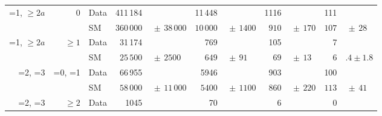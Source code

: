 \begin{table}[!t]
\begin{tabular}{rrlr@{}lr@{}lr@{}lr@{}l}
    =1, ${\geq}2a$ & 0         & Data & 411\,184   &                   & 11\,448   &                & 1116  &               & 111                  \\
                   &           & SM   & $360\,000$ & $\,\pm\, 38\,000$ & $10\,000$ & $\,\pm\, 1400$ & $910$ & $\,\pm\, 170$ & $107$ & $\,\pm\, 28$ \\[0.2ex]
    =1, ${\geq}2a$ & ${\geq}1$ & Data & 31\,174    &                   & 769       &                & 105   &               & 7                    \\
                   &           & SM   & $25\,500$  & $\,\pm\, 2500$    & $649$     & $\,\pm\, 91$   & $69$  & $\,\pm\, 13$  & $6$   & $.4 \pm 1.8$ \\[0.2ex]
    =2, =3         & =0, =1    & Data & 66\,955    &                   & 5946      &                & 903   &               & 100                  \\
                   &           & SM   & $58\,000$  & $\,\pm\, 11\,000$ & $5400$    & $\,\pm\, 1100$ & $860$ & $\,\pm\, 220$ & $113$ & $\,\pm\, 41$ \\[0.2ex]
    =2, =3         & ${\geq}2$ & Data & 1045       &                   & 70        &                & 6     &               & 0                    \\

\end{tabular}
\end{table}
